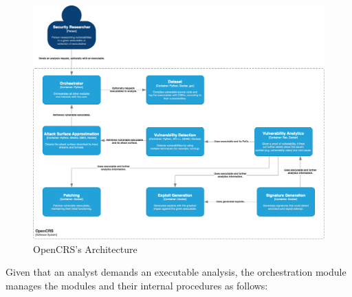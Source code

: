 \documentclass[../main.tex]{subfiles}
\begin{document}
\begin{landscape}
  \renewcommand*\figurename{Figure}
  \begin{figure}[!h]
    \centering
    \includegraphics[height=0.95\textheight]{images/opencrs.png}
    \caption{OpenCRS's Architecture}
    \label{fig:opencrs_architecture}
  \end{figure}
\end{landscape}

Given that an analyst demands an executable analysis, the orchestration module
manages the modules and their internal procedures as follows:
\end{document}
